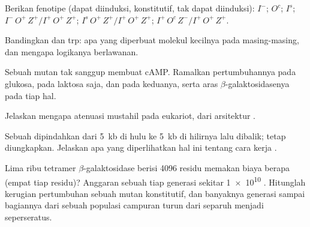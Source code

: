 \begin{exercise}[$\star\star$]\label{exo:b1:expression-control:5}
Berikan fenotipe (dapat diinduksi, konstitutif, tak dapat diinduksi): $I^-$;
$O^c$; $I^s$; $I^-\,O^+\,Z^+ / I^+\,O^+\,Z^+$; $I^s\,O^+\,Z^+ /
I^+\,O^+\,Z^+$; $I^+\,O^c\,Z^- / I^+\,O^+\,Z^+$.
\end{exercise}

\begin{exercise}[$\star\star$]\label{exo:b1:expression-control:6}
Bandingkan  dan trp: apa yang diperbuat molekul kecilnya pada
 masing-masing, dan mengapa logikanya berlawanan.
\end{exercise}

\begin{exercise}[$\star\star$]\label{exo:b1:expression-control:7}
Sebuah mutan tak sanggup membuat cAMP. Ramalkan pertumbuhannya pada
glukosa, pada laktosa saja, dan pada keduanya, serta aras
$\beta$-galaktosidasenya pada tiap hal.
\end{exercise}

\begin{exercise}[$\star\star$]\label{exo:b1:expression-control:8}
Jelaskan mengapa atenuasi mustahil pada eukariot, dari arsitektur .
\end{exercise}

\begin{exercise}[$\star\star$]\label{exo:b1:expression-control:9}
Sebuah  dipindahkan dari \qty{5}{kb} di hulu  ke
\qty{5}{kb} di hilirnya lalu dibalik;  tetap diungkapkan.
Jelaskan apa yang diperlihatkan hal ini tentang cara kerja .
\end{exercise}

\begin{exercise}[$\star\star\star$]\label{exo:b1:expression-control:10}
Lima ribu tetramer $\beta$-galaktosidase berisi \qty{4096}{} residu
memakan biaya berapa  (empat tiap residu)? Anggaran sebuah  tiap
generasi sekitar \qty{1e10}{} . Hitunglah kerugian pertumbuhan
sebuah mutan konstitutif, dan banyaknya generasi sampai bagiannya dari
sebuah populasi campuran turun dari separuh menjadi seperseratus.
\end{exercise}

